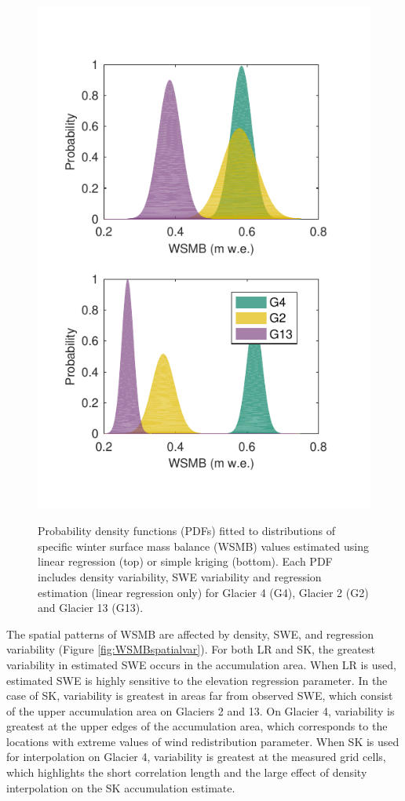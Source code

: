 \documentclass[twocolumn,letterpaper]{igs}
\begin{document}
\begin{figure}
	\centering
	\includegraphics[width =\textwidth]{WSMBDist_full.pdf}\\
	\caption{Probability density functions (PDFs) fitted to distributions of specific winter surface mass balance (WSMB) values estimated using linear regression (top) or simple kriging (bottom). Each PDF includes density variability, SWE variability and regression estimation (linear regression only) for Glacier 4 (G4), Glacier 2 (G2) and Glacier 13 (G13).}
	\label{fig:WSMBDist_LRvsSK}
\end{figure}


The spatial patterns of WSMB are affected by density, SWE, and regression variability (Figure \ref{fig:WSMBspatialvar}).  For both LR and SK, the greatest variability in estimated SWE occurs in the accumulation area. When LR is used, estimated SWE is highly sensitive to the elevation regression parameter. In the case of SK, variability is greatest in areas far from observed SWE, which consist of the upper accumulation area on Glaciers 2 and 13. On Glacier 4, variability is greatest at the upper edges of the accumulation area, which corresponds to the locations with extreme values of wind redistribution parameter. When SK is used for interpolation on Glacier 4, variability is greatest at the measured grid cells, which highlights the short correlation length and the large effect of density interpolation on the SK accumulation estimate.
\end{document}
